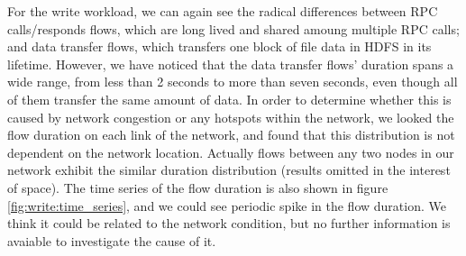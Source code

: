 For the write workload, we can again see the radical differences between RPC calls/responds flows, which are long lived and shared amoung multiple RPC calls; and data transfer flows, which transfers one block of file data in HDFS in its lifetime. However, we have noticed that the data transfer flows' duration spans a wide range, from less than 2 seconds to more than seven seconds, even though all of them transfer the same amount of data. In order to determine whether this is caused by network congestion or any hotspots within the network, we looked the flow duration on each link of the network, and found that this distribution is not dependent on the network location. Actually flows between any two nodes in our network exhibit the similar duration distribution (results omitted in the interest of space). The time series of the flow duration is also shown in figure \ref{fig:write:time_series}, and we could see periodic spike in the flow duration. We think it could be related to the network condition, but no further information is avaiable to investigate the cause of it.

